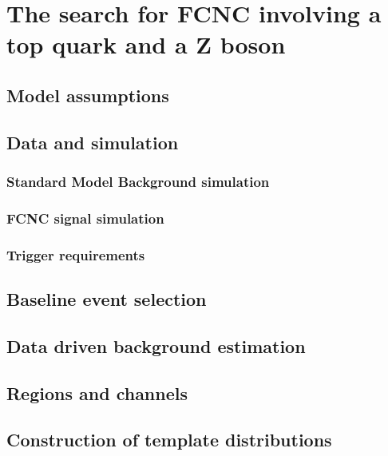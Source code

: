 \chapter{The search for FCNC involving a top quark and a Z boson}
\section{Model assumptions}
\section{Data and simulation}
\subsection{Standard Model Background simulation}



\subsection{FCNC signal simulation}
\subsection{Trigger requirements}
\section{Baseline event selection}
\section{Data driven background estimation}
\section{Regions and channels}
\section{Construction of template distributions}
